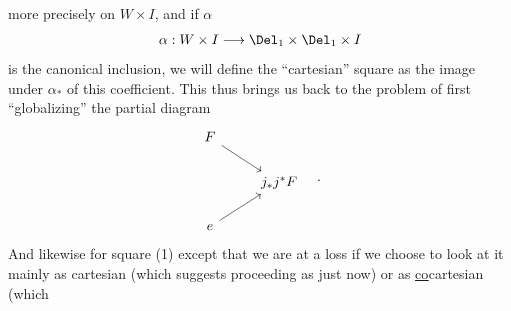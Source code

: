 
more precisely on $W \times I$, and if $\alpha$
\[ \alpha : W \times I \longrightarrow \Del_1 \times \Del_1 \times I \]
is the canonical inclusion, we will define the ``cartesian'' square as the image under $\alpha_*$ of this coefficient. This thus brings us back to the problem of first ``globalizing'' the partial diagram
\[
\begin{tikzcd}
F \arrow[dr] & \\
& j_*j^*F \\
e \arrow[ur] &
\end{tikzcd}
\quad .
\]
And likewise for square (1) except that we are at a loss if we choose to look at it mainly as cartesian (which suggests proceeding as just now) or as \underline{co}cartesian (which %